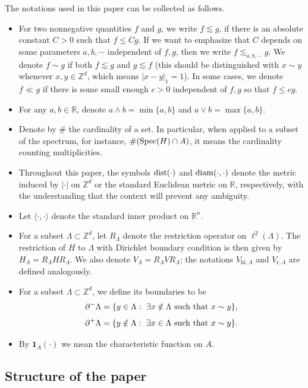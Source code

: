 \documentclass[11pt,reqno,UTF8,twoside]{amsart}
\newcommand{\Z}{\mathbb{Z}}
\newcommand{\R}{\mathbb{R}}
\newcommand{\spec}{{\rm Spec}}
\newcommand{\dist}{{\rm dist}}
\newcommand{\diam}{{\rm diam}}
\theoremstyle{definition}
\numberwithin{equation}{section}
\begin{document}
The  notations used in this paper can be collected as follows. 
\begin{itemize}
\item  For two nonnegative quantities $f$ and $g$, we write $f\lesssim g$, if there is an absolute constant
$C > 0$ such that $f\leq Cg$. If we want to emphasize that $C$ depends on some parameters
$a,b,\cdots$ independent of $f,g$, then we write $f\lesssim_{a,b,\cdots}g$. We denote $f\sim g$ if  both $f\lesssim g$ and $g\lesssim f$ (this should be distinguished with $x\sim y$ whenever  $x,y\in\Z^d$, which means $|x-y|_1=1$). In some cases, we denote  $f\ll g$  if there is some small  enough $c>0$ independent of $f,g$ so that $f\leq c g.$ 
\item For any $a,b\in\R$, denote $a\wedge b=\min\{a,b\}$ and $a\vee b=\max\{a,b\}$. 
  \item  Denote by $\#$ the cardinality of a set. In particular, when applied to a subset of the spectrum, for instance, $\#(\spec(H)\cap A)$, it means  the cardinality counting multiplicities. 
  \item Throughout this paper, the symbols $\dist(\cdot)$ and $\diam(\cdot, \cdot)$ denote the metric induced by $|\cdot|$ on $\Z^d$ or the standard Euclidean metric on $\R$, respectively, with the understanding that the context will prevent any ambiguity.
  \item Let $\langle \cdot, \cdot \rangle$ denote  the standard inner product on $\R^n$.
  \item For a subset $\Lambda \subset \mathbb{Z}^d$, let $R_{\Lambda}$ denote the restriction operator  on  $\ell^2(\Lambda)$. The restriction of $H$ to $\Lambda$ with Dirichlet boundary condition  is then given by  $H_{\Lambda} = R_{\Lambda} H R_{\Lambda}$. We also denote $V_{\Lambda}=R_{\Lambda}V R_{\Lambda}$; the notations $V_{\text{hi},\Lambda}$ and $V_{\text{r},\Lambda}$ are defined analogously.
  \item For a subset $\Lambda\subset \Z^d$, we define its boundaries to be  
\[\partial^{-}\Lambda =\{y\in \Lambda: \ \exists  x\notin \Lambda\ {\rm such\ that} \ x\sim y\},\]
\[\partial^{+}\Lambda =\{y \notin \Lambda: \ \exists  x\in \Lambda\ {\rm such\ that} \ x\sim y\}.\]
\item By $\bm 1_{A}(\cdot)$ we mean the characteristic  function on $A$. 
\end{itemize}

\subsection{Structure of the paper}
\end{document}
